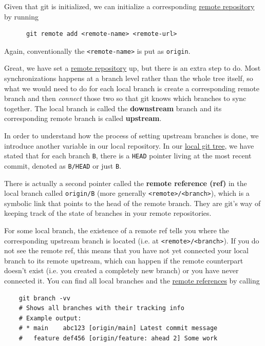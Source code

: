   \begin{definition}
    \label{def:add-remote}
    Given that git is initialized, we can initialize a corresponding \hyperref[def:remote-repository]{remote repository} by running 
    \begin{lstlisting}
      git remote add <remote-name> <remote-url>
    \end{lstlisting}
    Again, conventionally the \texttt{<remote-name>} is put as \texttt{origin}. 
  \end{definition} 

  Great, we have set a \hyperref[def:remote-repository]{remote repository} up, but there is an extra step to do. Most synchronizations happens at a branch level rather than the whole tree itself, so what we would need to do for each local branch is create a corresponding remote branch and then \textit{connect} those two so that git knows which branches to sync together. The local branch is called the \textbf{downstream} branch and its corresponding remote branch is called \textbf{upstream}. 

  In order to understand how the process of setting upstream branches is done, we introduce another variable in our local repository. In our \hyperref[def:local-git-tree]{local git tree}, we have stated that for each branch \texttt{B}, there is a \texttt{HEAD} pointer living at the most recent commit, denoted as \texttt{B/HEAD} or just \texttt{B}. 

  \begin{definition}
    \label{def:remote-references}
 
    There is actually a second pointer called the \textbf{remote reference (ref)} in the local branch called \texttt{origin/B} (more generally \texttt{<remote>/<branch>}), which is a symbolic link that points to the head of the remote branch. They are git's way of keeping track of the state of branches in your remote repositories. 
  \end{definition} 

  For some local branch, the existence of a remote ref tells you where the corresponding upstream branch is located (i.e. at \texttt{<remote>/<branch>}). If you do not see the remote ref, this means that you have not yet connected your local branch to its remote upstream, which can happen if the remote counterpart doesn't exist (i.e. you created a completely new branch) or you have never connected it. You can find all local branches and the \hyperref[def:remote-references]{remote references} by calling 
  \begin{lstlisting}
    git branch -vv
    # Shows all branches with their tracking info
    # Example output:
    # * main    abc123 [origin/main] Latest commit message
    #   feature def456 [origin/feature: ahead 2] Some work
  \end{lstlisting} 

